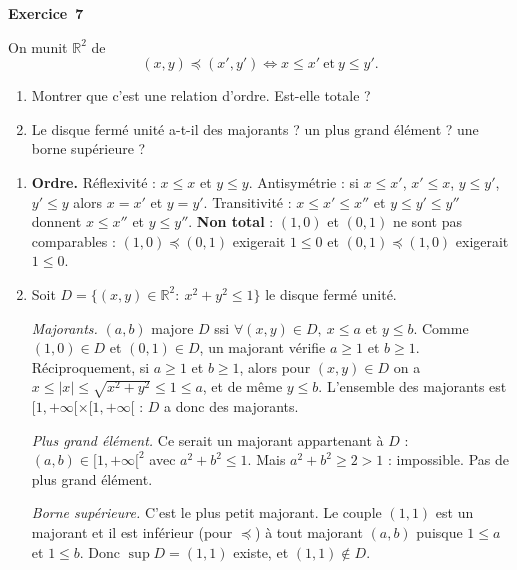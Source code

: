 \documentclass[11pt,a4paper]{article}
\newcommand{\R}{\mathbb{R}}\newcommand{\N}{\mathbb{N}}\newcommand{\Z}{\mathbb{Z}}
\begin{document}
	\medskip\noindent\textbf{\Large\color{bleu}Exercice~7}\nopagebreak
	\begin{enonce}
		On munit $\mathbb{R}^2$ de
		\[
		(x,y)\preccurlyeq(x',y')\iff x\leq x'\ \text{et}\ y\leq y'.
		\]
		\begin{enumerate}
			\item Montrer que c’est une relation d’ordre. Est-elle totale ?
			\item Le disque fermé unité a-t-il des majorants ? un plus grand élément ? une borne supérieure ?
		\end{enumerate}
	\end{enonce}
	\begin{corrige}
		\begin{enumerate}
			\item \textbf{Ordre.} Réflexivité : $x\leq x$ et $y\leq y$. Antisymétrie : si $x\leq x'$, $x'\leq x$, $y\leq y'$, $y'\leq y$ alors $x=x'$ et $y=y'$. Transitivité : $x\leq x'\leq x''$ et $y\leq y'\leq y''$ donnent $x\leq x''$ et $y\leq y''$. \textbf{Non total} : $(1,0)$ et $(0,1)$ ne sont pas comparables : $(1,0)\preccurlyeq(0,1)$ exigerait $1\leq0$ et $(0,1)\preccurlyeq(1,0)$ exigerait $1\leq0$.
			\item Soit $D=\{(x,y)\in\R^2:\ x^2+y^2\leq1\}$ le disque fermé unité.
			
			\emph{Majorants.} $(a,b)$ majore $D$ ssi $\forall(x,y)\in D,\ x\leq a$ et $y\leq b$. Comme $(1,0)\in D$ et $(0,1)\in D$, un majorant vérifie $a\geq1$ et $b\geq1$. Réciproquement, si $a\geq1$ et $b\geq1$, alors pour $(x,y)\in D$ on a $x\leq|x|\leq\sqrt{x^2+y^2}\leq1\leq a$, et de même $y\leq b$. L'ensemble des majorants est $[1,+\infty[\times[1,+\infty[$ : $D$ a donc des majorants.
			
			\emph{Plus grand élément.} Ce serait un majorant appartenant à $D$ : $(a,b)\in[1,+\infty[^2$ avec $a^2+b^2\leq1$. Mais $a^2+b^2\geq2>1$ : impossible. Pas de plus grand élément.
			
			\emph{Borne supérieure.} C'est le plus petit majorant. Le couple $(1,1)$ est un majorant et il est inférieur (pour $\preccurlyeq$) à tout majorant $(a,b)$ puisque $1\leq a$ et $1\leq b$. Donc $\sup D=(1,1)$ existe, et $(1,1)\notin D$.
		\end{enumerate}
	\end{corrige}
	
\end{document}
